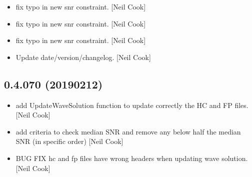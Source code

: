 \documentclass[a4paper,10pt,english]{report}
\begin{document}
\begin{itemize}
\item {} 
 \sphinxhyphen{} fix typo in new snr constraint. {[}Neil Cook{]}

\item {} 
 \sphinxhyphen{} fix typo in new snr constraint. {[}Neil Cook{]}

\item {} 
 \sphinxhyphen{} fix typo in new snr constraint. {[}Neil Cook{]}

\item {} 
Update date/version/changelog. {[}Neil Cook{]}

\end{itemize}


\subsection{0.4.070 (2019\sphinxhyphen{}02\sphinxhyphen{}12)}
\label{\detokenize{misc/changelog:id207}}\begin{itemize}
\item {} 
 \sphinxhyphen{} add UpdateWaveSolution  function to
update correctly the HC and FP files. {[}Neil Cook{]}

\item {} 
 \sphinxhyphen{} add criteria to check median SNR and remove
any below half the median SNR (in specific order) {[}Neil Cook{]}

\item {} 
 \sphinxhyphen{} BUG FIX \sphinxhyphen{} hc and fp files have wrong
headers when updating wave solution. {[}Neil Cook{]}

\end{itemize}
\end{document}
